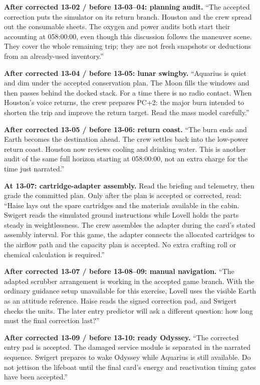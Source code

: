 \textbf{After corrected 13-02 / before 13-03--04: planning audit.}
``The accepted correction puts the simulator on its return branch.
Houston and the crew spread out the consumable sheets.
The oxygen and power audits both start their accounting at
058:00:00, even though this discussion follows the maneuver scene.
They cover the whole remaining trip; they are not fresh snapshots
or deductions from an already-used inventory.''

\textbf{After corrected 13-04 / before 13-05: lunar swingby.}
``Aquarius is quiet and dim under the accepted conservation plan.
The Moon fills the windows and then passes behind the docked stack.
For a time there is no radio contact. When Houston's voice returns,
the crew prepares PC+2: the major burn intended to shorten the trip
and improve the return target. Read the mass model carefully.''

\textbf{After corrected 13-05 / before 13-06: return coast.}
``The burn ends and Earth becomes the destination ahead.
The crew settles back into the low-power return coast.
Houston now reviews cooling and drinking water.
This is another audit of the same full horizon starting at 058:00:00,
not an extra charge for the time just narrated.''

\textbf{At 13-07: cartridge-adapter assembly.}
Read the briefing and telemetry, then grade the committed plan.
Only after the plan is accepted or corrected, read:
``Haise lays out the spare cartridges and the materials available
in the cabin. Swigert reads the simulated ground instructions while
Lovell holds the parts steady in weightlessness.
The crew assembles the adapter during the card's stated assembly
interval. For this game, the adapter connects the allocated
cartridges to the airflow path and the capacity plan is accepted.
No extra crafting roll or chemical calculation is required.''

\textbf{After corrected 13-07 / before 13-08--09: manual navigation.}
``The adapted scrubber arrangement is working in the accepted game
branch. With the ordinary guidance setup unavailable for this
exercise, Lovell uses the visible Earth as an attitude reference.
Haise reads the signed correction pad, and Swigert checks the units.
The later entry predictor will ask a different question:
how long must the final correction last?''

\textbf{After corrected 13-09 / before 13-10: ready Odyssey.}
``The corrected entry pad is accepted.
The damaged service module is separated in the narrated sequence.
Swigert prepares to wake Odyssey while Aquarius is still available.
Do not jettison the lifeboat until the final card's energy and
reactivation timing gates have been accepted.''

